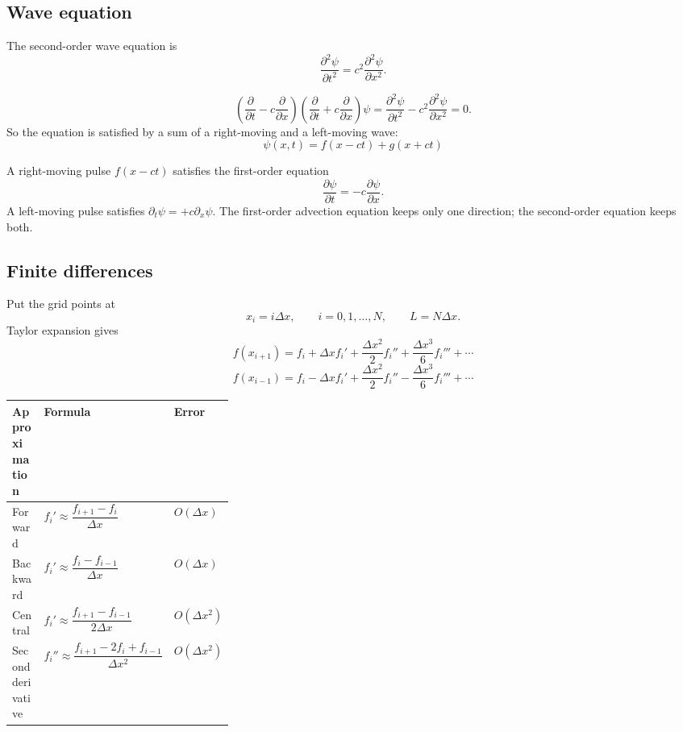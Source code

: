 \documentclass[10.5pt,a4paper]{article}
\begin{document}
\subsection{Wave equation}

The second-order wave equation is
\[
\frac{\partial^2\psi}{\partial t^2}
=c^2\frac{\partial^2\psi}{\partial x^2}.
\]

\begin{derivbox}
\[
\left(\frac{\partial}{\partial t}-c\frac{\partial}{\partial x}\right)
\left(\frac{\partial}{\partial t}+c\frac{\partial}{\partial x}\right)\psi
=
\frac{\partial^2\psi}{\partial t^2}
-c^2\frac{\partial^2\psi}{\partial x^2}
=0.
\]
So the equation is satisfied by a sum of a right-moving and a
left-moving wave:
\[
\boxed{\;\psi(x,t)=f(x-ct)+g(x+ct)\;}
\]
\end{derivbox}

\begin{keybox}
A right-moving pulse \(f(x-ct)\) satisfies the first-order equation
\[
\frac{\partial\psi}{\partial t}
=-c\frac{\partial\psi}{\partial x}.
\]
A left-moving pulse satisfies
\(\partial_t\psi=+c\partial_x\psi\).
The first-order advection equation keeps only one direction; the
second-order equation keeps both.
\end{keybox}

\subsection{Finite differences}

Put the grid points at
\[
x_i=i\Delta x,\qquad i=0,1,\dots,N,\qquad L=N\Delta x.
\]
Taylor expansion gives
\[
f(x_{i+1})=f_i+\Delta x f_i'
+\frac{\Delta x^2}{2}f_i''
+\frac{\Delta x^3}{6}f_i'''+\cdots
\]
\[
f(x_{i-1})=f_i-\Delta x f_i'
+\frac{\Delta x^2}{2}f_i''
-\frac{\Delta x^3}{6}f_i'''+\cdots
\]

\begin{center}
\begin{tabularx}{\linewidth}{@{}>{\raggedright\arraybackslash}p{0.20\linewidth}
  >{\raggedright\arraybackslash}X
  >{\centering\arraybackslash}p{0.12\linewidth}@{}}
\toprule
\rowcolor{accent!10}
\textbf{Approximation} & \textbf{Formula} & \textbf{Error} \\
\midrule
Forward & \(f_i'\approx\dfrac{f_{i+1}-f_i}{\Delta x}\) & \(O(\Delta x)\) \\
Backward & \(f_i'\approx\dfrac{f_i-f_{i-1}}{\Delta x}\) & \(O(\Delta x)\) \\
Central & \(f_i'\approx\dfrac{f_{i+1}-f_{i-1}}{2\Delta x}\) & \(O(\Delta x^2)\) \\
Second derivative & \(f_i''\approx\dfrac{f_{i+1}-2f_i+f_{i-1}}{\Delta x^2}\) & \(O(\Delta x^2)\) \\
\bottomrule
\end{tabularx}
\end{center}
\end{document}
